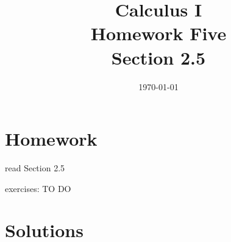 \documentclass[letterpaper, landscape]{exam}
\title{Calculus I \\ Homework Five \\ Section 2.5}
\author{}
\date{\today}
\begin{document}
  \maketitle

  \section{Homework}
    \begin{itemize*}
      \item read Section 2.5
      \item exercises: TO DO
    \end{itemize*}

  \ifprintanswers

  \section{Solutions}
\end{document}
